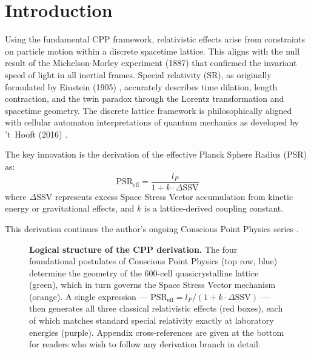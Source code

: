 \documentclass[11pt,letterpaper]{article}
\begin{document}
\section{Introduction}

Using the fundamental CPP framework, relativistic effects arise from constraints on particle motion within a discrete spacetime lattice. This aligns with the null result of the Michelson-Morley experiment (1887) \cite{michelson1887} that confirmed the invariant speed of light in all inertial frames. Special relativity (SR), as originally formulated by Einstein (1905) \cite{einstein1905}, accurately describes time dilation, length contraction, and the twin paradox through the Lorentz transformation and spacetime geometry. The discrete lattice framework is philosophically aligned with cellular automaton interpretations of quantum mechanics as developed by 't~Hooft (2016) \cite{thooft2016}.

The key innovation is the derivation of the effective Planck Sphere Radius (PSR) as:
\begin{equation}
\text{PSR}_{\text{eff}} = \frac{l_P}{1 + k \cdot \Delta\text{SSV}}
\label{eq:psr}
\end{equation}
where $\Delta$SSV represents excess Space Stress Vector accumulation from kinetic energy or gravitational effects, and $k$ is a lattice-derived coupling constant.

This derivation continues the author's ongoing Conscious Point Physics series \cite{abshier2025}.



\begin{figure}[H]
  \centering
  
  \caption{%
    \textbf{Logical structure of the CPP derivation.}
    The four foundational postulates of Conscious Point Physics (top row,
    blue) determine the geometry of the 600-cell quasicrystalline lattice
    (green), which in turn governs the Space Stress Vector mechanism (orange).
    A single expression — $\text{PSR}_{\text{eff}} = l_P/(1+k\cdot\Delta\text{SSV})$
    — then generates all three classical relativistic effects (red boxes), each
    of which matches standard special relativity exactly at laboratory energies
    (purple). Appendix cross-references are given at the bottom for readers who
    wish to follow any derivation branch in detail.
  }
  \label{fig:flowchart}
\end{figure}
\end{document}
